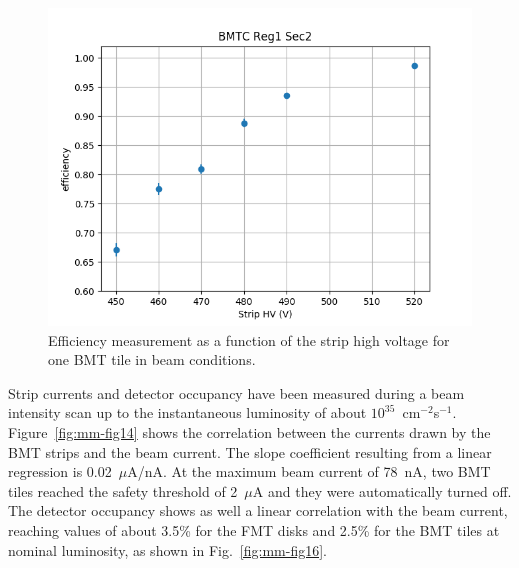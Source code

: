 \begin{figure}[htb]
 \includegraphics[width=1.0\columnwidth,keepaspectratio]{images/hvscan_BMTC_R1_S2.png}
 \caption{Efficiency measurement as a function of the strip high voltage for one BMT tile in beam conditions.}
 \label{fig:mm-eff_scan}
\end{figure}

Strip currents and detector occupancy have been measured during a beam intensity scan up to the instantaneous luminosity
of about $10^{35}$~cm$^{-2}$s$^{-1}$. Figure~\ref{fig:mm-fig14} shows the correlation between the currents drawn by
the BMT strips and the beam current. The slope coefficient resulting from a linear regression is 0.02~$\mu$A/nA. At the
maximum beam current of 78~nA, two BMT tiles reached the safety threshold of 2~$\mu$A and they were automatically
turned off. The detector occupancy shows as well a linear correlation with the beam current, reaching values of about
3.5\% for the FMT disks and 2.5\% for the BMT tiles at nominal luminosity, as shown in Fig.~\ref{fig:mm-fig16}.


